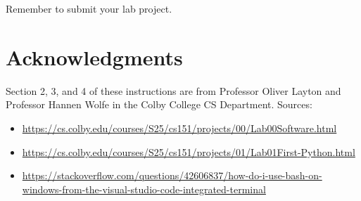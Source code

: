 \documentclass[12pt]{article}
\begin{document}
Remember to submit your lab project. 


\section{Acknowledgments}
Section 2, 3, and 4 of these instructions are from Professor Oliver Layton and Professor Hannen Wolfe in the Colby College CS Department. 
Sources:
\begin{itemize}
\item \footnotesize{\url{https://cs.colby.edu/courses/S25/cs151/projects/00/Lab00Software.html}}
\item \url{https://cs.colby.edu/courses/S25/cs151/projects/01/Lab01First-Python.html}
\item \footnotesize{\url{https://stackoverflow.com/questions/42606837/how-do-i-use-bash-on-windows-from-the-visual-studio-code-integrated-terminal}}
\end{itemize}
\end{document}
